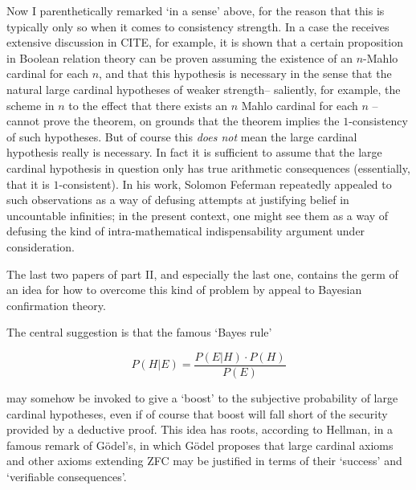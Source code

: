 \documentclass{asl}
\theoremstyle{definition}
\begin{document}
Now I parenthetically remarked `in a sense' above, for the reason that
this is typically only so when it comes to consistency strength. 
In a case the receives extensive discussion in CITE, for example, it is shown 
that a certain proposition in Boolean relation theory can be proven assuming 
the existence of an $n$-Mahlo cardinal for each $n$, and that this hypothesis 
is necessary in the sense that the natural large cardinal hypotheses of 
weaker strength-- saliently, for example, the scheme in $n$ to the effect 
that there exists an $n$ Mahlo cardinal for each $n$ -- cannot prove the theorem, 
on grounds that the theorem implies the $1$-consistency of such hypotheses. But 
of course this \emph{does not} mean the large cardinal hypothesis really is necessary.
In fact it is sufficient to assume that the large cardinal hypothesis in question 
only has true arithmetic consequences (essentially, that it is $1$-consistent). 
In his work, Solomon Feferman repeatedly appealed to such observations 
as a way of defusing attempts at justifying belief in uncountable infinities;
in the present context, one might see them as a way of defusing the kind of 
intra-mathematical indispensability argument under consideration.

The last two papers of part II, and especially the last one, contains the germ
of an idea for how to overcome this kind of problem by appeal to Bayesian 
confirmation theory.

The central suggestion is that the famous `Bayes rule'

\begin{equation}
P(H|E) = \frac{P(E|H)\cdot P(H)}{P(E)}
\end{equation}

may somehow be invoked to give a `boost' to the subjective probability 
of large cardinal hypotheses, even if of course that boost will fall 
short of the security provided by a deductive proof. 
This idea has roots, according to Hellman, in a famous remark of G\"odel's, 
in which G\"odel proposes that large cardinal axioms and other axioms 
extending ZFC may be justified in terms of their `success' and 
`verifiable consequences'.
\end{document}
